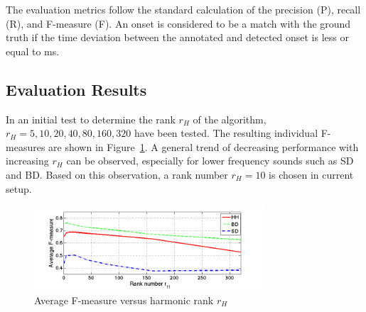 \documentclass{article}
\newcommand{\figref}[1]{\mbox{Figure~\ref{#1}}}
\begin{document}
The evaluation metrics follow the standard calculation of the precision (P), recall (R), and F-measure (F).  %
An onset is considered to be a match with the ground truth if the time deviation between the annotated and detected onset is less or equal to \unit[50]{ms}.  

\subsection{Evaluation Results}\label{subsec:evaluation results}
In an initial test to determine the rank $r_H$ of the algorithm, $r_H = {5, 10, 20, 40, 80, 160, 320}$ have been tested. The resulting individual F-measures are shown in \figref{fig:rankTest}. A general trend of decreasing performance with increasing $r_H$ can be observed, especially for lower frequency sounds such as SD and BD. Based on this observation, a rank number $r_H = 10$ is chosen in current setup.


\begin{figure}
 \centerline{
 \includegraphics[width=8.5cm]{rankTest.png}}
 \caption{Average F-measure versus harmonic rank $r_{H}$}%
 \label{fig:rankTest}
\end{figure}
\end{document}
